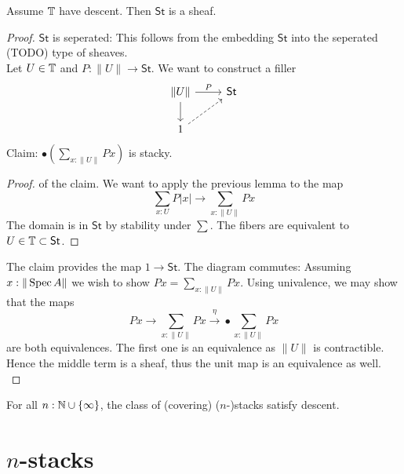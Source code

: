 \documentclass{article}
\newcommand{\St}{\mathsf{St}}
\begin{document}
\begin{theorem}
	Assume $\mathbb{T}$ have descent. Then $\St$ is a sheaf.
\end{theorem}
\begin{proof}
	$\St$ is seperated: This follows from the embedding $\St$ into the seperated (TODO) type of sheaves. \\
	Let $U \in \mathbb{T}$ and $P : \|U\| \to \St$. We want to construct a filler 
	\[\begin{tikzcd}
		{\| U\|} & \St \\
		1
		\arrow["P", from=1-1, to=1-2]
		\arrow[from=1-1, to=2-1]
		\arrow[dashed, from=2-1, to=1-2]
	\end{tikzcd}\]
	Claim: $\bullet (\sum_{x: \|U\|} P x)$ is stacky.
	\begin{proof} of the claim. We want to apply the previous lemma to the map 
		\[\sum_{x : U} P | x | \to \sum_{x : \| U\|} P x \]
		The domain is in $\St$ by stability under $\sum$. The fibers are equivalent to $U \in \bT \subset \St$.				
	\end{proof}
    The claim provides the map $1 \to \St$. The diagram commutes: Assuming $x : \|\operatorname{Spec} A\|$ we wish to show $P x = \sum_{x: \|U\|} P x$. Using univalence, we may show that the maps 
	\[P x \to \sum_{x: \|U\|} P x \overset{\eta}{\to} \bullet \sum_{x: \|U\|} P x\]
	are both equivalences.
	The first one is an equivalence as $\|U\|$ is contractible. Hence the middle term is a sheaf, thus the unit map is an equivalence as well. \\
	
	
	
\end{proof}
\begin{corollary}
	For all $n : \mathbb{N} \cup \{\infty \}$, the class of (covering) ($n$-)stacks satisfy descent.
\end{corollary}








\section{ $n$-stacks}

        
\end{document}
